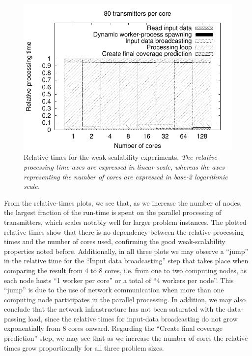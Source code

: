 \begin{figure}
\begin{minipage}[t]{0.31\textwidth}
\includegraphics[width=1\columnwidth]{04-framework_design_and_implementation/img/weak_scaling_relative_time_plot_80}%
\end{minipage}

\caption{Relative times for the weak-scalability experiments.\emph{ }\textit{\emph{The
relative-processing time axes are expressed in linear scale, whereas
the axes representing the number of cores are expressed in base-2
logarithmic scale.\label{fig:weak_scaling-relative_times}}}}
\end{figure}


From the relative-times plots, we see that, as we increase the number
of nodes, the largest fraction of the run-time is spent on the parallel
processing of transmitters, which scales notably well for larger problem
instances. The plotted relative times show that there is no dependency
between the relative processing times and the number of cores used,
confirming the good weak-scalability properties noted before. Additionally,
in all three plots we may observe a ``jump'' in the relative time
for the ``Input data broadcasting'' step that takes place when comparing
the result from 4 to 8 cores, i.e. from one to two computing nodes,
as each node hosts ``1 worker per core'' or a total of ``4 workers
per node''. This ``jump'' is due to the use of network communication
when more than one computing node participates in the parallel processing.
In addition, we may also conclude that the network infrastructure
has not been saturated with the data-passing load, since the relative
times for input-data broadcasting do not grow exponentially from 8
cores onward. Regarding the ``Create final coverage prediction''
step, we may see that as we increase the number of cores the relative
times grow proportionally for all three problem sizes.


